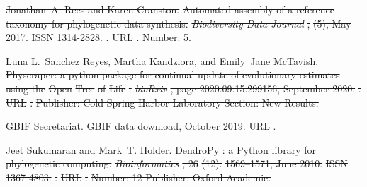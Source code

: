 \documentclass[oupdraft]{sysbio_sse}
\providecommand{\DIFdel}[1]{{\protect\color{red}\sout{#1}}}                      %
\begin{document}
\DIFdel{Jonathan~A. Rees and Karen Cranston.
}%
\DIFdel{Automated assembly of a reference taxonomy for phylogenetic data
  synthesis.
}%
\emph{\DIFdel{Biodiversity Data Journal}}%
\DIFdel{, }%
\DIFdel{(5), May 2017.
}%
\DIFdel{ISSN 1314-2828.
}%
\DIFdel{.
}%
\DIFdel{URL }%
\DIFdel{.
}%
\DIFdel{Number: 5.
}%

\DIFdel{Luna L.~Sanchez Reyes, Martha Kandziora, and Emily~Jane McTavish.
}%
\DIFdel{Physcraper: a python package for continual update of evolutionary
  estimates using the }%
\DIFdel{Open}%
\DIFdel{Tree}%
\DIFdel{of }%
\DIFdel{Life}%
\DIFdel{.
}%
\emph{\DIFdel{bioRxiv}}%
\DIFdel{, page 2020.09.15.299156, September 2020.
}%
\DIFdel{.
}%
\DIFdel{URL
  }%
\DIFdel{.
}%
\DIFdel{Publisher: Cold Spring Harbor Laboratory Section: New Results.
}%

\DIFdel{GBIF Secretariat.
}%
\DIFdel{GBIF}%
\DIFdel{data download, October 2019.
}%
\DIFdel{URL
  }%
\DIFdel{.
}%

\DIFdel{Jeet Sukumaran and Mark~T. Holder.
}%
\DIFdel{DendroPy}%
\DIFdel{: a }%
\DIFdel{Python}%
\DIFdel{library for phylogenetic computing.
}%
\emph{\DIFdel{Bioinformatics}}%
\DIFdel{, 26}%
\DIFdel{(12):}%
\DIFdel{1569--1571, June
  2010.
}%
\DIFdel{ISSN 1367-4803.
}%
\DIFdel{.
}%
\DIFdel{URL
  }%
\DIFdel{.
}%
\DIFdel{Number: 12 Publisher: Oxford Academic.
}%
\end{document}
